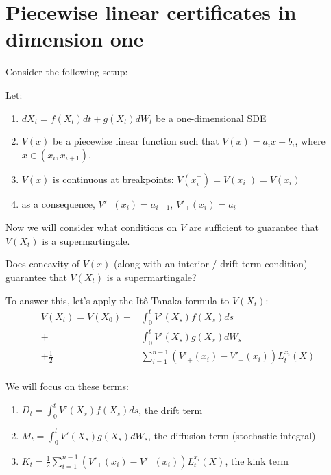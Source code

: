 \section{Piecewise linear certificates in dimension one}
\label{sec:piecewise-linear}

Consider the following setup:

\begin{setup}
Let:
\begin{enumerate}
    \item $dX_t = f(X_t) dt + g(X_t) dW_t$ be a one-dimensional SDE
    \item $V(x)$ be a piecewise linear function such that $V(x) = a_i x + b_i$, where $x \in \left( x_i, x_{i+1} \right)$.
    \item $V(x)$ is continuous at breakpoints: $V(x_i^+)=V(x_i^-) = V(x_i)$
    \item as a consequence, $V'_{-}(x_i) = a_{i-1}$, $V'_{+}(x_i) = a_i$
\end{enumerate}

\end{setup}

Now we will consider what conditions on $V$ are sufficient to guarantee that $V(X_t)$ is a supermartingale.

\begin{hypothesis}
Does concavity of $V(x)$ (along with an interior / drift term condition) guarantee that $V(X_t)$ is a supermartingale?
\end{hypothesis}

To answer this, let's apply the Itô-Tanaka formula to $V(X_t)$:
\begin{align}
    V(X_t) = V(X_0) + &\int_0^t V'(X_s) f(X_s) ds \\
        + &\int_0^t V'(X_s) g(X_s) dW_s \\
        + \frac{1}{2} &\sum_{i=1}^{n-1} \left( V'_{+}(x_i) - V'_{-}(x_i) \right) L_t^{x_i}(X) \\
\end{align}

We will focus on these terms: 

\begin{enumerate}
  \item $D_t = \int_0^t V'(X_s) f(X_s) ds$, the drift term
  \item $M_t = \int_0^t V'(X_s) g(X_s) dW_s$, the diffusion term (stochastic integral)
  \item $K_t = \frac{1}{2} \sum_{i=1}^{n-1} \left( V'_{+}(x_i) - V'_{-}(x_i) \right) L_t^{x_i}(X)$, the kink term
\end{enumerate}


